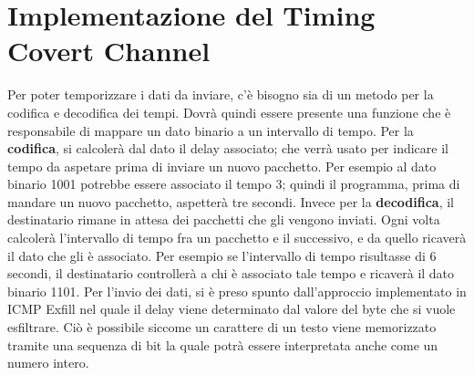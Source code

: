 \section{Implementazione del Timing Covert Channel}
Per poter temporizzare i dati da inviare, c'è bisogno sia di un metodo per la codifica e decodifica dei tempi. 
Dovrà quindi essere presente una funzione che è responsabile di mappare un dato binario a un intervallo di tempo. 
\vspace{1ex} \newline 
Per la \textbf{codifica}, si calcolerà dal dato il delay associato; che verrà usato per indicare il tempo da aspetare prima di inviare un nuovo 
pacchetto.  
Per esempio al dato binario 1001 potrebbe essere associato il tempo 3; quindi il programma, prima di mandare un nuovo pacchetto, aspetterà tre secondi. 
\vspace{1ex} \newline 
Invece per la \textbf{decodifica}, il destinatario rimane in attesa dei pacchetti che gli vengono inviati. 
Ogni volta calcolerà l'intervallo di tempo fra un pacchetto e il successivo, e da quello ricaverà il dato che gli è associato.  
Per esempio se l'intervallo di tempo risultasse di 6 secondi, il destinatario controllerà a chi è associato tale tempo e ricaverà il dato binario 1101. 
\vspace{3ex} \newline 
Per l'invio dei dati, si è preso spunto dall'approccio implementato in ICMP Exfill \cite{icmp-exfill} 
nel quale il delay viene determinato dal valore del byte che si vuole esfiltrare. 
Ciò è possibile siccome un carattere di un testo viene memorizzato tramite una sequenza di bit 
la quale potrà essere interpretata anche come un numero intero. 


